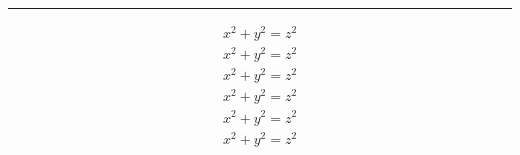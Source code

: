 \documentclass[11pt]{article}
\begin{document}
\allowdisplaybreaks
\begin{mdframed}
\rule{\linewidth}{0pt}
\begin{align*}
x^2 + y^2 = z^2 \\
x^2 + y^2 = z^2 \\
x^2 + y^2 = z^2 \\
x^2 + y^2 = z^2 \\
x^2 + y^2 = z^2 \\
x^2 + y^2 = z^2
\end{align*}
\end{mdframed}
\end{document}
